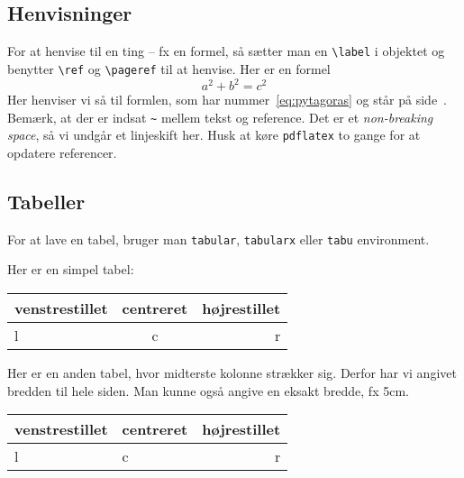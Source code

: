 \documentclass[a4,12pt]{article}
\numberwithin{equation}{section}
\begin{document}
\subsection{Henvisninger}
For at henvise til en ting -- fx en formel, så sætter man en \verb$\label$ i objektet og benytter \verb$\ref$ og \verb$\pageref$ til at henvise. Her er en formel
\begin{equation}
  a^2 + b^2 = c^2
  \label{eq:pytagoras}
\end{equation}
Her henviser vi så til formlen, som har nummer~\ref{eq:pytagoras} og står på side~\pageref{eq:pytagoras}. Bemærk, at der er indsat \verb$~$ mellem tekst og reference. Det er et \emph{non-breaking space}, så vi undgår et linjeskift her. Husk at køre \verb$pdflatex$ to gange for at opdatere referencer.

\subsection{Tabeller}
For at lave en tabel, bruger man \verb$tabular$, \verb$tabularx$ eller \verb$tabu$ environment.

Her er en simpel tabel:

\noindent
\begin{tabu}{|l|c|r|}
  \hline %
  venstrestillet & centreret & højrestillet \\ %
  \hline %
  l & c & r \\
  \hline %
\end{tabu}

Her er en anden tabel, hvor midterste kolonne strækker sig. Derfor har vi angivet bredden til hele siden. Man kunne også angive en eksakt bredde, fx 5cm.

\noindent
\begin{tabu} to \textwidth {|l|X[c]|r|}
  \hline %
  venstrestillet & centreret & højrestillet \\
  \hline %
  l & c & r \\
  \hline %
\end{tabu}

\end{document}
